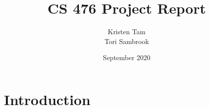 \documentclass{article}
\title{CS 476 Project Report}
\author{Kristen Tam \\ Tori Sambrook}
\date{September 2020}
\begin{document}
\maketitle

\newpage
\tableofcontents

\newpage
\section{Introduction}
\end{document}
